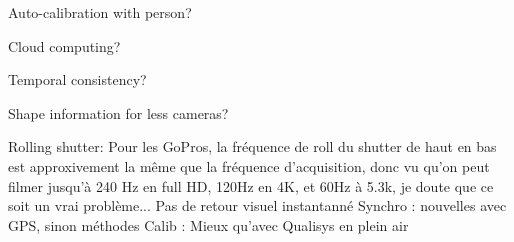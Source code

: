 Auto-calibration with person?

Cloud computing?

Temporal consistency?

Shape information for less cameras?

Rolling shutter: Pour les GoPros, la fréquence de roll du shutter de haut en bas est approxivement la même que la fréquence d'acquisition, donc vu qu'on peut filmer jusqu'à 240 Hz en full HD, 120Hz en 4K, et 60Hz à 5.3k, je doute que ce soit un vrai problème...
Pas de retour visuel instantanné
Synchro : nouvelles avec GPS, sinon méthodes
Calib : Mieux qu'avec Qualisys en plein air

\blindtext
